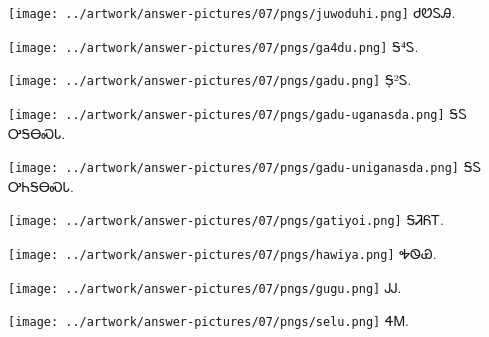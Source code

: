 \documentclass[avery5371,frame]{flashcards}%
\begin{document}
\begin{flashcard}{
\texttt{[image: ../artwork/answer-pictures/07/pngs/juwoduhi.png]}
}\Huge ᏧᏬᏚᎯ.
\end{flashcard}

\begin{flashcard}{
\texttt{[image: ../artwork/answer-pictures/07/pngs/ga4du.png]}
}\Huge Ꭶ⁴Ꮪ.
\end{flashcard}

\begin{flashcard}{
\texttt{[image: ../artwork/answer-pictures/07/pngs/gadu.png]}
}\Huge Ꭶ̣²Ꮪ.
\end{flashcard}

\begin{flashcard}{
\texttt{[image: ../artwork/answer-pictures/07/pngs/gadu-uganasda.png]}
}\Huge 	ᎦᏚ ᎤᎦᎾᏍᏓ.
\end{flashcard}

\begin{flashcard}{
\texttt{[image: ../artwork/answer-pictures/07/pngs/gadu-uniganasda.png]}
}\Huge 	ᎦᏚ ᎤᏂᎦᎾᏍᏓ.
\end{flashcard}

\begin{flashcard}{
\texttt{[image: ../artwork/answer-pictures/07/pngs/gatiyoi.png]}
}\Huge ᎦᏘᏲᎢ.
\end{flashcard}

\begin{flashcard}{
\texttt{[image: ../artwork/answer-pictures/07/pngs/hawiya.png]}
}\Huge ᎭᏫᏯ.
\end{flashcard}

\begin{flashcard}{
\texttt{[image: ../artwork/answer-pictures/07/pngs/gugu.png]}
}\Huge ᎫᎫ.
\end{flashcard}

\begin{flashcard}{
\texttt{[image: ../artwork/answer-pictures/07/pngs/selu.png]}
}\Huge ᏎᎷ.
\end{flashcard}
\end{document}
